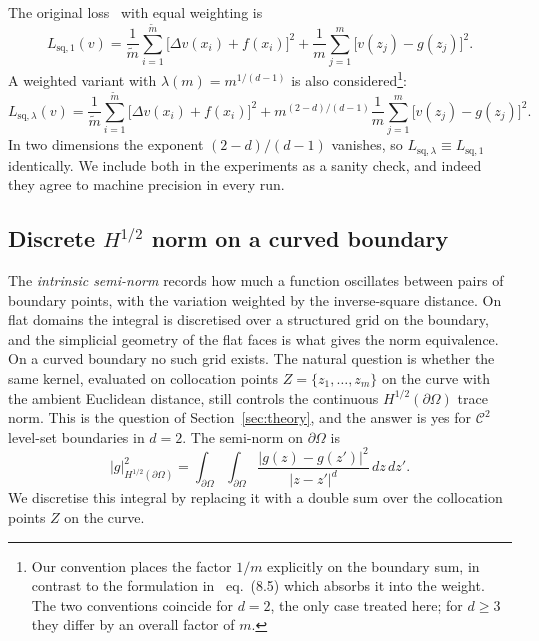 \documentclass[11pt]{article}
\newcommand{\bOmg}{\partial\Omega}
\newcommand{\C}{\mathcal{C}}
\newcommand{\Honehalf}{H^{1/2}(\partial\Omega)}
\newcommand{\seminorm}[1]{\left|#1\right|}
\newcommand{\mtil}{\widetilde{m}}
\newcommand{\Zbnd}{Z}
\begin{document}
The original loss~\cite{raissi2019} with equal weighting is
\begin{equation}\label{eq:Lsq1}
  L_{\mathrm{sq},1}(v)
  = \frac{1}{\mtil}\sum_{i=1}^{\mtil}
    \bigl[\Delta v(x_i) + f(x_i)\bigr]^2
  + \frac{1}{m}\sum_{j=1}^{m}
    \bigl[v(z_j) - g(z_j)\bigr]^2.
\end{equation}
A weighted variant with $\lambda(m) = m^{1/(d-1)}$ is also
considered\footnote{Our convention places the factor $1/m$
explicitly on the boundary sum, in contrast to the formulation
in~\cite{bonito2025} eq.~(8.5) which absorbs it into the weight.
The two conventions coincide for $d=2$, the only case treated here;
for $d\geq 3$ they differ by an overall factor of $m$.}:
\begin{equation}\label{eq:Lsqlam}
  L_{\mathrm{sq},\lambda}(v)
  = \frac{1}{\mtil}\sum_{i=1}^{\mtil}
    \bigl[\Delta v(x_i) + f(x_i)\bigr]^2
  + m^{(2-d)/(d-1)}
    \frac{1}{m}\sum_{j=1}^{m}
    \bigl[v(z_j) - g(z_j)\bigr]^2.
\end{equation}
In two dimensions the exponent $(2-d)/(d-1)$ vanishes, so
$L_{\mathrm{sq},\lambda} \equiv L_{\mathrm{sq},1}$ identically. We
include both in the experiments as a sanity check, and indeed they
agree to machine precision in every run.

\subsection{Discrete $H^{1/2}$ norm on a curved boundary}

The \textit{intrinsic semi-norm} records how much a function
oscillates between pairs of boundary points, with the variation
weighted by the inverse-square distance. On flat domains the
integral is discretised over a structured grid on the boundary, and
the simplicial geometry of the flat faces is what gives the norm
equivalence. On a curved boundary no such grid exists. The natural
question is whether the same kernel, evaluated on collocation
points $\Zbnd = \{z_1,\ldots,z_m\}$ on the curve with the ambient
Euclidean distance, still controls the continuous $\Honehalf$
trace norm. This is the question of Section~\ref{sec:theory}, and
the answer is yes for $\C^2$ level-set boundaries in $d=2$. The
semi-norm on $\bOmg$ is
\begin{equation}\label{eq:h12_cont}
  \seminorm{g}^2_{H^{1/2}(\bOmg)}
  = \int_{\bOmg}\int_{\bOmg}
    \frac{|g(z)-g(z')|^2}{|z-z'|^d}\,dz\,dz'.
\end{equation}
We discretise this integral by replacing it with a double sum over
the collocation points $\Zbnd$ on the curve.
\end{document}
